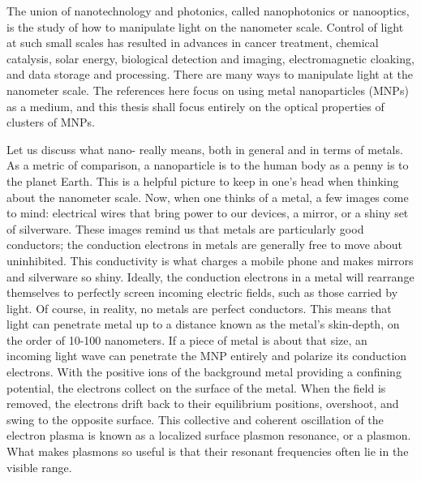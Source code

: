 \documentclass [11pt, proquest] {uwthesis}[2016/11/22]
\begin{document}
The union of nanotechnology and photonics, called nanophotonics or nanooptics, is the study of how to manipulate light on the nanometer scale. Control of light at such small scales has resulted in advances in cancer treatment\cite{ElSayedCancer,LiuCancer}, chemical catalysis\cite{Halas2013,Camden2017}, solar energy\cite{Atwater2014,WuSolar}, biological detection and imaging\cite{vanDuyneSensing,Bezryadina2017}, electromagnetic cloaking\cite{AluCloaking,YeCloaking}, and data storage and processing\cite{MoloneyData,NaughtonData}. There are many ways to manipulate light at the nanometer scale. The references here focus on using metal nanoparticles (MNPs) as a medium, and this thesis shall focus entirely on the optical properties of clusters of MNPs.

Let us discuss what nano- really means, both in general and in terms of metals. As a metric of comparison, a nanoparticle is to the human body as a penny is to the planet Earth. This is a helpful picture to keep in one's head when thinking about the nanometer scale. Now, when one thinks of a metal, a few images come to mind: electrical wires that bring power to our devices, a mirror, or a shiny set of silverware. These images remind us that metals are particularly good conductors; the conduction electrons in metals are generally free to move about uninhibited. This conductivity is what charges a mobile phone and makes mirrors and silverware so shiny. Ideally, the conduction electrons in a metal will rearrange themselves to perfectly screen incoming electric fields, such as those carried by light. Of course, in reality, no metals are perfect conductors. This means that light can penetrate metal up to a distance known as the metal's skin-depth, on the order of 10-100 nanometers. If a piece of metal is about that size, an incoming light wave can penetrate the MNP entirely and polarize its conduction electrons. With the positive ions of the background metal providing a confining potential, the electrons collect on the surface of the metal. When the field is removed, the electrons drift back to their equilibrium positions, overshoot, and swing to the opposite surface. This collective and coherent oscillation of the electron plasma is known as a localized surface plasmon resonance, or a plasmon. What makes plasmons so useful is that their resonant frequencies often lie in the visible range\cite{KREIBIG1985}.
\end{document}
